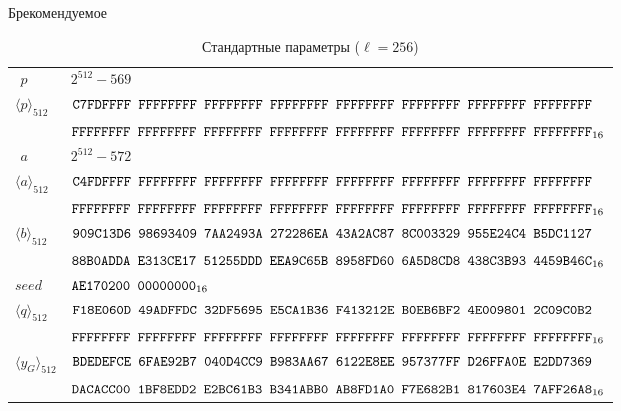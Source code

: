 \begin{appendix}{Б}{рекомендуемое}
\clearpage

\begin{table}[!h]
\caption{Стандартные параметры ($\ell=256$)}\label{Table.STD.StdCurve256}
{\small
\begin{tabular}{|l|l|}
\hline
$\phantom{\langle}p\phantom{\rangle}$ &
$2^{512}-569$\\
$\langle p\rangle_{512}$ & 
$\texttt{C7FDFFFF~FFFFFFFF~FFFFFFFF~FFFFFFFF~FFFFFFFF~FFFFFFFF~FFFFFFFF~FFFFFFFF}$\\
& 
$\texttt{FFFFFFFF~FFFFFFFF~FFFFFFFF~FFFFFFFF~FFFFFFFF~FFFFFFFF~FFFFFFFF~FFFFFFFF}_{16}$\\
%
\hline
$\phantom{\langle}a\phantom{\rangle}$ &
$2^{512}-572$\\
$\langle a\rangle_{512}$ & 
$\texttt{C4FDFFFF~FFFFFFFF~FFFFFFFF~FFFFFFFF~FFFFFFFF~FFFFFFFF~FFFFFFFF~FFFFFFFF}$\\
& 
$\texttt{FFFFFFFF~FFFFFFFF~FFFFFFFF~FFFFFFFF~FFFFFFFF~FFFFFFFF~FFFFFFFF~FFFFFFFF}_{16}$\\
%
\hline
$\langle b\rangle_{512}$ & 
$\texttt{909C13D6~98693409~7AA2493A~272286EA~43A2AC87~8C003329~955E24C4~B5DC1127}$\\
&
$\texttt{88B0ADDA~E313CE17~51255DDD~EEA9C65B~8958FD60~6A5D8CD8~438C3B93~4459B46C}_{16}$\\
%
\hline
$seed$ & 
$\texttt{AE170200~00000000}_{16}$\\
%
\hline
%
%
$\langle q\rangle_{512}$ & 
$\texttt{F18E060D~49ADFFDC~32DF5695~E5CA1B36~F413212E~B0EB6BF2~4E009801~2C09C0B2}$\\
&
$\texttt{FFFFFFFF~FFFFFFFF~FFFFFFFF~FFFFFFFF~FFFFFFFF~FFFFFFFF~FFFFFFFF~FFFFFFFF}_{16}$\\
%
\hline
$\langle y_G\rangle_{512}$ & 
$\texttt{BDEDEFCE~6FAE92B7~040D4CC9~B983AA67~6122E8EE~957377FF~D26FFA0E~E2DD7369}$\\
&
$\texttt{DACACC00~1BF8EDD2~E2BC61B3~B341ABB0~AB8FD1A0~F7E682B1~817603E4~7AFF26A8}_{16}$\\
\hline
\end{tabular}
}
\end{table}

%
%
%

\mbox{}
\vfill
\mbox{}
\clearpage

\end{appendix}

